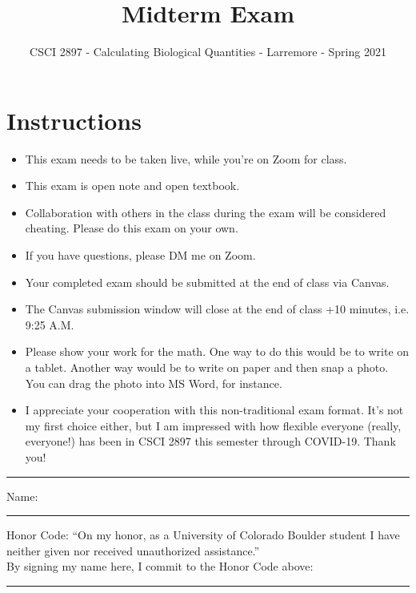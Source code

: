 \documentclass[11pt,onecolumn,superscriptaddress,notitlepage]{article}
\date{}
\newcounter{choice}
\begin{document}
\author{CSCI 2897 - Calculating Biological Quantities - Larremore - Spring 2021}
\title{Midterm Exam}
\maketitle


\section*{Instructions}
\begin{itemize}
	\item	This exam needs to be taken live, while you're on Zoom for class.
	\item This exam is open note and open textbook. 
	\item Collaboration with others in the class during the exam will be considered cheating. Please do this exam on your own.
	\item If you have questions, please DM me on Zoom.
	\item Your completed exam should be submitted at the end of class via Canvas.
	\item The Canvas submission window will close at the end of class +10 minutes, i.e. 9:25 A.M. 
	\item Please show your work for the math. One way to do this would be to write on a tablet. Another way would be to write on paper and then snap a photo. You can drag the photo into MS Word, for instance. 
	\item I appreciate your cooperation with this non-traditional exam format. It's not my first choice either, but I am impressed with how flexible everyone (really, everyone!) has been in CSCI 2897 this semester through COVID-19. Thank you!
\end{itemize}

\vspace{1in}

\hrule \vspace{0.15in}
Name:\\ 

\hrule \vspace{0.15in}
Honor Code: ``On my honor, as a University of Colorado Boulder student I have neither given nor received unauthorized assistance.''\\

By signing my name here, I commit to the Honor  Code above: 
\\ \hrule
\end{document}
